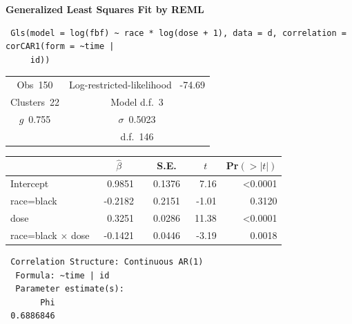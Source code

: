  \noindent \textbf{Generalized Least Squares Fit by REML}
 
 \begin{verbatim}
 Gls(model = log(fbf) ~ race * log(dose + 1), data = d, correlation = corCAR1(form = ~time | 
     id))
 \end{verbatim}
 
 {\selectfont \begin{center}\begin{tabular}{|c|c|}\hline
&\\\hline
Obs~\hfill 150&Log-restricted-likelihood ~\hfill -74.69\\
Clusters~\hfill 22&Model d.f.~\hfill 3\\
$g$~\hfill 0.755&$\sigma$~\hfill 0.5023\\
&d.f.~\hfill 146\\
\hline
\end{tabular}
\end{center}}
 
 \setlongtables\begin{longtable}{lrrrr}\hline
 \multicolumn{1}{l}{}&\multicolumn{1}{c}{$\hat{\beta}$}&\multicolumn{1}{c}{S.E.}&\multicolumn{1}{c}{$t$}&\multicolumn{1}{c}{Pr$(>|t|)$}\tabularnewline
 \hline
 \endhead
 \hline
 \endfoot
 Intercept&~ 0.9851~&~0.1376~& 7.16&\textless 0.0001\tabularnewline
 race=black&~-0.2182~&~0.2151~&-1.01&0.3120\tabularnewline
 dose&~ 0.3251~&~0.0286~&11.38&\textless 0.0001\tabularnewline
 race=black $\times$ dose&~-0.1421~&~0.0446~&-3.19&0.0018\tabularnewline
 \hline
 \end{longtable}
 \addtocounter{table}{-1}
 \begin{verbatim}
 Correlation Structure: Continuous AR(1)
  Formula: ~time | id 
  Parameter estimate(s):
       Phi 
 0.6886846 
 \end{verbatim}
 

